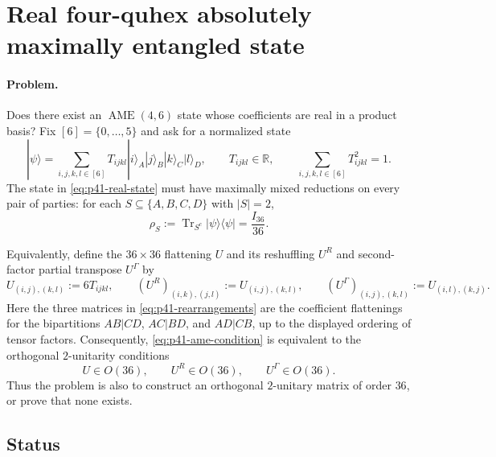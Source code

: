 \section{Real four-quhex absolutely maximally entangled state}
\label{sec:problem-41}

\paragraph{Problem.}
Does there exist an $\operatorname{AME}(4,6)$ state whose coefficients are
real in a product basis?  Fix $[6]=\{0,\ldots,5\}$ and ask for a normalized
state
\begin{equation}
  |\psi\rangle
  =\sum_{i,j,k,l\in[6]}T_{ijkl}|i\rangle_A|j\rangle_B
    |k\rangle_C|l\rangle_D,
  \qquad
  T_{ijkl}\in\mathbb{R},
  \qquad
  \sum_{i,j,k,l\in[6]}T_{ijkl}^{2}=1 .
  \label{eq:p41-real-state}
\end{equation}
The state in \eqref{eq:p41-real-state} must have maximally mixed reductions
on every pair of parties: for each $S\subseteq\{A,B,C,D\}$ with $|S|=2$,
\begin{equation}
  \rho_S:=\operatorname{Tr}_{S^{c}}|\psi\rangle\!\langle\psi|
  =\frac{I_{36}}{36} .
  \label{eq:p41-ame-condition}
\end{equation}

Equivalently, define the $36\times36$ flattening $U$ and its reshuffling
$U^R$ and second-factor partial transpose $U^\Gamma$ by
\begin{equation}
  U_{(i,j),(k,l)}:=6T_{ijkl},
  \qquad
  (U^R)_{(i,k),(j,l)}:=U_{(i,j),(k,l)},
  \qquad
  (U^\Gamma)_{(i,j),(k,l)}:=U_{(i,l),(k,j)} .
  \label{eq:p41-rearrangements}
\end{equation}
Here the three matrices in \eqref{eq:p41-rearrangements} are the coefficient
flattenings for the bipartitions $AB|CD$, $AC|BD$, and $AD|CB$, up to the
displayed ordering of tensor factors.  Consequently,
\eqref{eq:p41-ame-condition} is equivalent to the orthogonal
$2$-unitarity conditions
\begin{equation}
  U\in O(36),
  \qquad
  U^R\in O(36),
  \qquad
  U^\Gamma\in O(36) .
  \label{eq:p41-orthogonal-two-unitarity}
\end{equation}
Thus the problem is also to construct an orthogonal $2$-unitary matrix of
order $36$, or prove that none exists.

\subsection*{Status}

